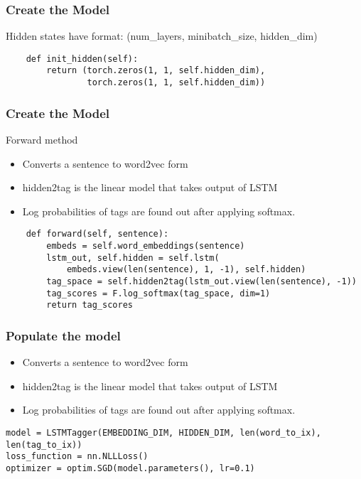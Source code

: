 \begin{frame}[fragile]
\frametitle{Create the Model}
Hidden states have format: (num\_layers, minibatch\_size, hidden\_dim)
\begin{lstlisting}
	def init_hidden(self):
        return (torch.zeros(1, 1, self.hidden_dim),
                torch.zeros(1, 1, self.hidden_dim))		
\end{lstlisting}      
\end{frame} 

\begin{frame}[fragile]
\frametitle{Create the Model}
Forward method
\begin{itemize}
\item Converts a sentence to word2vec form
\item hidden2tag is the linear model that takes output of LSTM
\item Log probabilities of tags are found out after applying softmax.
\end{itemize}
\begin{lstlisting}
    def forward(self, sentence):
        embeds = self.word_embeddings(sentence)
        lstm_out, self.hidden = self.lstm(
            embeds.view(len(sentence), 1, -1), self.hidden)
        tag_space = self.hidden2tag(lstm_out.view(len(sentence), -1))
        tag_scores = F.log_softmax(tag_space, dim=1)
        return tag_scores
\end{lstlisting}      
\end{frame} 

\begin{frame}[fragile]
\frametitle{Populate the model}
\begin{itemize}
\item Converts a sentence to word2vec form
\item hidden2tag is the linear model that takes output of LSTM
\item Log probabilities of tags are found out after applying softmax.
\end{itemize}
\begin{lstlisting}
model = LSTMTagger(EMBEDDING_DIM, HIDDEN_DIM, len(word_to_ix), len(tag_to_ix))
loss_function = nn.NLLLoss()
optimizer = optim.SGD(model.parameters(), lr=0.1)
\end{lstlisting}      
\end{frame} 

